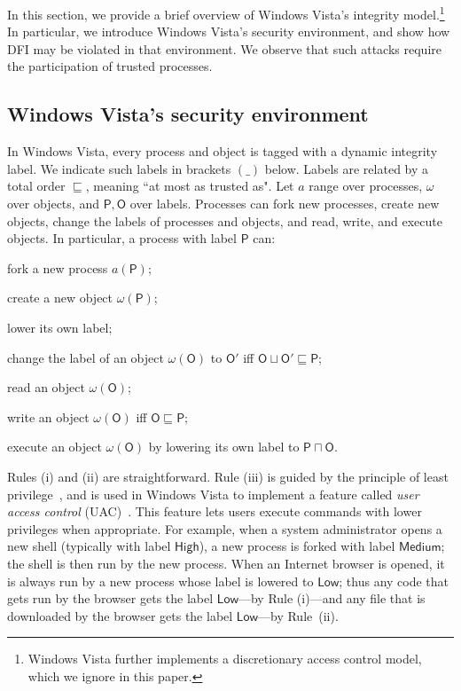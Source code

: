 \documentclass{sigplanconf}
\newcommand{\labp}{\mathsf P}
\newcommand{\labo}{\mathsf O}
\newcounter{compactenumc}
\newenvironment{compactenum2}
        {\begin{list}{(\roman{compactenumc})}{
        \usecounter{compactenumc}
\setlength{\leftmargin}{7mm}
        \setlength{\labelwidth}{\leftmargin}
        }}
        {\end{list}}
\begin{document}
In this section, we provide a brief overview of Windows Vista's integrity model.\footnote{Windows Vista further implements a discretionary access control model, which we ignore in this paper.} In particular, we introduce Windows Vista's security environment, and show how DFI may be violated in that environment. We observe that such attacks require the participation of trusted processes.

\subsection{Windows Vista's security environment} In Windows Vista, every process and object is tagged with a dynamic integrity label. We indicate such labels in
brackets $(\_)$ below. Labels are related by a total order $\sqsubseteq$, meaning ``at most as trusted as". 
Let $a$ range over processes, $\omega$ over objects, and $\labp,\labo$ over labels. Processes can fork new processes, create new objects, change the labels of processes and objects, and read, write, and execute objects. In particular, a process with label $\labp$ can:
\begin{compactenum2}
\item fork a new process $a(\labp)$; \item create a new object $\omega(\labp)$; \item lower its own label; \item change the label of an object $\omega(\labo)$ to $\labo'$ iff $\labo \sqcup \labo' \sqsubseteq \labp$; \item read an object $\omega(\labo)$;
\item write an object $\omega(\labo)$ iff $\labo \sqsubseteq \labp$;
\item execute an object $\omega(\labo)$ by lowering its own label to $\labp \sqcap \labo$.
\end{compactenum2} 
Rules (i) and (ii) are straightforward. 
Rule (iii) is guided by the principle of least
privilege~\cite{protection}, and is used in Windows Vista to implement a feature called \emph{user access control}
(UAC)~\cite{uac}. This feature lets users execute
commands with lower privileges when appropriate. For example, when a system administrator opens a new shell (typically with label 
$\mathsf{High}$), a new process is forked with label 
$\mathsf{Medium}$; the shell is then run by the new
process. When an Internet browser is opened, it is always run by a
new process whose label is lowered to $\mathsf{Low}$; thus any code
that gets run by the browser gets the label $\mathsf{Low}$---by Rule (i)---and any file that is downloaded by the browser gets the label $\mathsf{Low}$---by Rule~(ii).   
\end{document}

